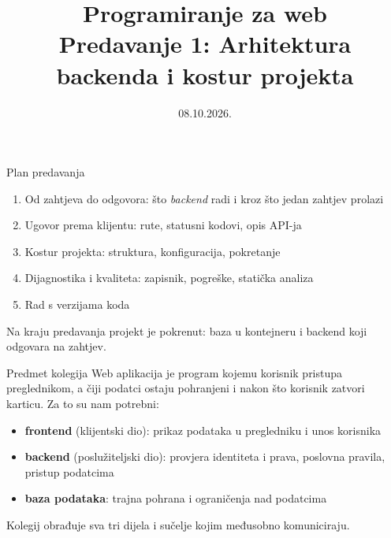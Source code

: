 

\title[Predavanje 1: Arhitektura backenda]{Programiranje za web \\ Predavanje 1: Arhitektura backenda i kostur projekta}
\date{08.10.2026.}



\frame{\titlepage}

\begin{frame}{Plan predavanja}
\begin{enumerate}
  \item Od zahtjeva do odgovora: što \emph{backend} radi i kroz što jedan zahtjev prolazi
  \item Ugovor prema klijentu: rute, statusni kodovi, opis API-ja
  \item Kostur projekta: struktura, konfiguracija, pokretanje
  \item Dijagnostika i kvaliteta: zapisnik, pogreške, statička analiza
  \item Rad s verzijama koda
\end{enumerate}

\vspace{0.6em}
Na kraju predavanja projekt je pokrenut: baza u kontejneru i backend koji odgovara na zahtjev.
\end{frame}

\begin{frame}{Predmet kolegija}
Web aplikacija je program kojemu korisnik pristupa preglednikom, a čiji podatci ostaju pohranjeni i nakon što korisnik zatvori karticu. Za to su nam potrebni:

\begin{itemize}
  \item \textbf{frontend} (klijentski dio): prikaz podataka u pregledniku i unos korisnika
  \item \textbf{backend} (poslužiteljski dio): provjera identiteta i prava, poslovna pravila, pristup podatcima
  \item \textbf{baza podataka}: trajna pohrana i ograničenja nad podatcima
\end{itemize}

\vspace{0.4em}
Kolegij obrađuje sva tri dijela i sučelje kojim međusobno komuniciraju.
\end{frame}

